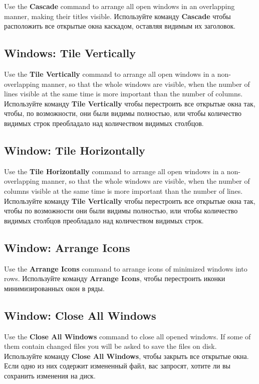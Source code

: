 \ifenglish
Use the {\bf Cascade} command to arrange all open windows
in an overlapping manner, making their titles visible.
\else
Используйте команду {\bf Cascade} чтобы расположить все открытые окна 
каскадом, оставляя видимым их заголовок.
\fi
\subsection{Windows: Tile Vertically}

\ifenglish
Use the {\bf Tile Vertically} command to arrange all open windows
in a non-overlapping manner, so that the whole windows are
visible, when the number of lines visible at the same time 
is more important than the number of columns.
\else
Используйте команду {\bf Tile Vertically} чтобы перестроить все открытые
окна так, чтобы, по возможности, они были видимы полностью, или чтобы количество
видимых строк преобладало над количеством видимых столбцов.
\fi
\subsection{Window: Tile Horizontally}

\ifenglish
Use the {\bf Tile Horizontally} command to arrange all open windows
in a non-overlapping manner, so that the whole windows are
visible, when the number of columns visible at the same time 
is more important than the number of lines.
\else
Используйте команду {\bf Tile Vertically} чтобы перестроить все открытые
окна так, чтобы по возможности они были видимы полностью, или чтобы количество
видимых столбцов преобладало над количеством видимых строк.
\fi
\subsection{Window: Arrange Icons}

\ifenglish
Use the {\bf Arrange Icons} command to arrange icons of minimized 
windows into rows.
\else
Используйте команду {\bf Arrange Icons}, чтобы перестроить иконки 
минимизированных окон в ряды.
\fi
\subsection{Window: Close All Windows}

\ifenglish
Use the {\bf Close All Windows} command to close all opened windows.
If some of them contain changed files you will be asked to save the files
on disk.
\else
Используйте команду {\bf Close All Windows}, чтобы закрыть все открытые окна.
Если одно из них содержит измененный файл, вас запросят, хотите ли вы сохранить
изменения на диск.
\fi
